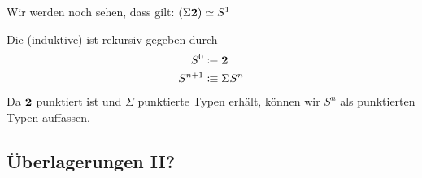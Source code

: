 \begin{bemerkung}
  Wir werden noch sehen, dass gilt: $(\Sigma\mathbf{2})\simeq S^1$
\end{bemerkung}

\begin{definition}
  Die (induktive)  ist rekursiv gegeben durch
  \begin{align*}
    S^0&\vcentcolon\mspace{-1.2mu}\equiv \mathbf{2} \\
    S^{n+1}&\vcentcolon\mspace{-1.2mu}\equiv \Sigma S^n
  \end{align*}
  Da $\mathbf{2}$ punktiert ist und $\Sigma$ punktierte Typen erhält, können wir $S^n$ als punktierten Typen auffassen.
\end{definition}

\subsection{Überlagerungen II?}
